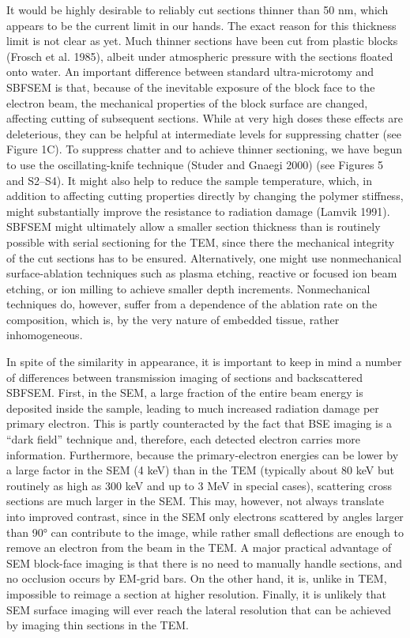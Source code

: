 \documentclass{article}
\begin{document}
It would be highly desirable to reliably cut sections thinner than 50 nm, which appears to be the current limit in our hands. The exact reason for this thickness limit is not clear as yet. Much thinner sections have been cut from plastic blocks (Frosch et al. 1985), albeit under atmospheric pressure with the sections floated onto water. An important difference between standard ultra-microtomy and SBFSEM is that, because of the inevitable exposure of the block face to the electron beam, the mechanical properties of the block surface are changed, affecting cutting of subsequent sections. While at very high doses these effects are deleterious, they can be helpful at intermediate levels for suppressing chatter (see Figure 1C). To suppress chatter and to achieve thinner sectioning, we have begun to use the oscillating-knife technique (Studer and Gnaegi 2000) (see Figures 5 and S2–S4). It might also help to reduce the sample temperature, which, in addition to affecting cutting properties directly by changing the polymer stiffness, might substantially improve the resistance to radiation damage (Lamvik 1991). SBFSEM might ultimately allow a smaller section thickness than is routinely possible with serial sectioning for the TEM, since there the mechanical integrity of the cut sections has to be ensured. Alternatively, one might use nonmechanical surface-ablation techniques such as plasma etching, reactive or focused ion beam etching, or ion milling to achieve smaller depth increments. Nonmechanical techniques do, however, suffer from a dependence of the ablation rate on the composition, which is, by the very nature of embedded tissue, rather inhomogeneous.

In spite of the similarity in appearance, it is important to keep in mind a number of differences between transmission imaging of sections and backscattered SBFSEM. First, in the SEM, a large fraction of the entire beam energy is deposited inside the sample, leading to much increased radiation damage per primary electron. This is partly counteracted by the fact that BSE imaging is a “dark field” technique and, therefore, each detected electron carries more information. Furthermore, because the primary-electron energies can be lower by a large factor in the SEM (4 keV) than in the TEM (typically about 80 keV but routinely as high as 300 keV and up to 3 MeV in special cases), scattering cross sections are much larger in the SEM. This may, however, not always translate into improved contrast, since in the SEM only electrons scattered by angles larger than 90° can contribute to the image, while rather small deflections are enough to remove an electron from the beam in the TEM. A major practical advantage of SEM block-face imaging is that there is no need to manually handle sections, and no occlusion occurs by EM-grid bars. On the other hand, it is, unlike in TEM, impossible to reimage a section at higher resolution. Finally, it is unlikely that SEM surface imaging will ever reach the lateral resolution that can be achieved by imaging thin sections in the TEM.
\end{document}
